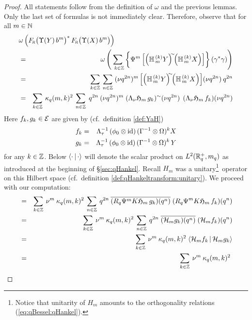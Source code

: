 \begin{proof}
All statements follow from the definition of $\omega$ and the previous lemmas.
Only the last set of formulas is not immediately clear. Therefore, observe that
for all $m\in\mathbb{N}$
\begin{eqnarray*}
\lefteqn{\omega \left(\vertL  \FRabb\!\left(\Upsilon(Y)\, b^m \vertM\right)^*
\FRabb\!
                \left(\Upsilon(X)\, b^m \vertM\right) \right)}  \\
&=&
    \omega \left(\sum_{\;\:k\in\ZZ} \left\{ \Psi^m
    \left[ \left(\YaH{m}{k}Y\right)^{\!\!\sim} \!\!
           \left(\YaH{m}{k}X\right)
    \right] \vertXL \! \right\}  (\gamma^*\gamma) \right) \\
&=&
    \sum_{k\in\ZZ}\: \sum_{n\in\ZZ} \; (\nu q^{2n})^m
    \left[ \left(\YaH{m}{k}Y\right)^{\!\!\sim} \!\! \left(\YaH{m}{k}X\right)
    \right] \! (\nu q^{2n})\: q^{2n}   \\
&=&
    \sum_{k\in\ZZ}\: \kq(m,k)^2 \:
    \sum_{n\in\ZZ}\; q^{2n} \: (\nu q^{2n})^m \;
    (\Lambda_\nu \holH{m} \,g_k)^\sim (\nu q^{2n}) \;\,
    (\Lambda_\nu \holH{m} \, f_k)(\nu q^{2n})
\end{eqnarray*}
Here $f_k,  g_k \in \mathcal E$ are given by (cf.\ definition \ref{def:YaH})
\begin{eqnarray*}
   f_k  &=&  \Lambda_\tau^{-1}\, (\phi_0 \otimes \mbox{\rm id})\, (\Gamma^{-1} \otimes \Omega)^k X
\\
   g_k  &=&  \Lambda_\tau^{-1}\, (\phi_0 \otimes \mbox{\rm id})\, (\Gamma^{-1} \otimes \Omega)^k \,Y
\end{eqnarray*}
for any $k\in \mathbb{Z}$. Below $\langle \cdot \,|\, \cdot \rangle$ will denote the scalar product on
$L^2(\mathbb{R}_q^+,m_q)$ as introduced at the beginning of \S\ref{sec:qHankel}\@.
Recall $H_m$ was a
unitary\footnote{Notice that unitarity of $H_m$ amounts to the orthogonality relations
(\ref{eq:qBessel:qHankel}).}\
operator on this Hilbert space (cf.\ definition \ref{def:qHankeltransform:unitary}).
We proceed with our computation:
\begin{eqnarray*}
&=& \sum_{k\in\ZZ} \: \nu^m \: \kq(m,k)^2 \:
    \sum_{n\in\ZZ} \: q^{2n} \:
    \overline{(R_q \Psi^m K \holH{m} \, g_k)(q^n)} \;
              (R_q \Psi^m K \holH{m} \, f_k)(q^n)   \\
&=& \sum_{k\in\ZZ} \: \nu^m \: \kq(m,k)^2 \:
    \sum_{n\in\ZZ} \: q^{2n} \; \overline{(\auxH{m} g_k)(q^n)}\; (\auxH{m} f_k)(q^n) \\
&=& \sum_{k\in\ZZ} \: \nu^m \: \kq(m,k)^2 \; \scal{\auxH{m} f_k}{\auxH{m} g_k} \\
&=& \sum_{k\in\ZZ} \: \nu^m \: \kq(m,k)^2 \;

\end{eqnarray*}
\end{proof}
